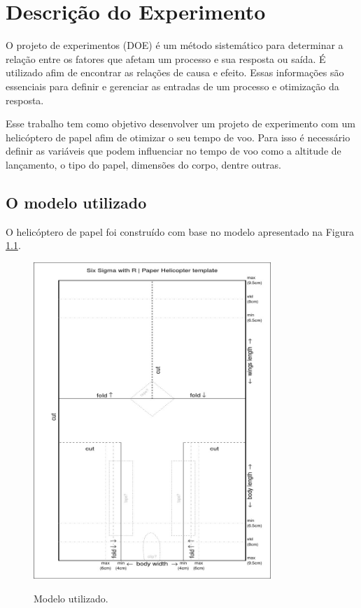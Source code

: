 \chapter{Descrição do Experimento}
\label{chap:descricao_do_experimento}


O projeto de experimentos (DOE) é um método sistemático para determinar a relação entre os fatores que afetam um processo e sua resposta ou saída. É utilizado afim de encontrar as relações de causa e efeito. Essas informações são essenciais para definir e gerenciar as entradas de um processo e otimização da resposta.

Esse trabalho tem como objetivo desenvolver um projeto de experimento com um helicóptero de papel afim de otimizar o seu tempo de voo. Para isso é necessário definir as variáveis que podem influenciar no tempo de voo como a altitude de lançamento, o tipo do papel, dimensões do corpo, dentre outras.





\section{O modelo utilizado}
\label{sec:o_modelo_utilizado}


O helicóptero de papel foi construído com base no modelo apresentado na Figura \ref{fig:template}.

\begin{figure}[H]
  \centering
  \caption{Modelo utilizado.}
  \includegraphics[width=0.8\textwidth]{images/template.jpeg}
  \label{fig:template}
\end{figure}


